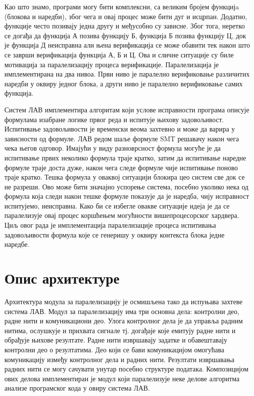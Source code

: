 \documentclass[12pt,oneside]{memoir}
\begin{document}
Као што знамо, програми могу бити комплексни, са великим бројем функцијa (блокова и наредби), због чега и овај процес може бити дуг и исцрпан. Додатно, функције често позивају једна другу и међусобно су зависне. Због тога, неретко се догађа да функција А позива функцију Б, функција Б позива функцију Ц, док је функција Д неисправна али њена верификација се може обавити тек након што се заврши верификација функција А, Б и Ц. Ова и сличне ситуације су биле мотивација за паралелизацију процеса верификације. Паралелизација је имплементирана на два нивоа. Први ниво је паралелно верификовање различитих наредби у оквиру једног блока, а други ниво је паралелно верификовање самих функција.

Систем ЛАВ имплементира алгоритам који услове исправности програма описује формулама изабране логике првог реда и испитује њихову задовољивост.  Испитивање задовољивости је  временски веома захтевно и може да варира у зависности од формуле. ЛАВ редом шаље формуле SMT решавачу након чега чека његов одговор. Имајући у виду разноврсност формула могуће је да испитивање првих неколико формула траје кратко, затим да испитивање наредне формуле траје доста дуже, након чега следе формуле чије испитивање поново траје кратко. Тешка формула у оваквој ситуацији блокира цео систем све док се не разреши. Ово може бити значајно успорење система, посебно уколико нека од формула која следи након тешке формуле показује да је наредба, чију исправност испитујемо, неисправна. 	
Како би се избегле овакве ситуације идеја је да се паралелизује овај процес коршћењем могућности вишепроцесорског хардвера. Циљ овог рада је имплементација паралелизације процеса испитивања задовољивости формула које се генеришу у оквиру контекста блока једне наредбе. 

\section{Опис архитектуре}

Архитектура модула за паралелизацију је осмишљена тако да испуњава захтеве система ЛАВ. Модул за паралелизацију има три основна дела: контролни део, радне нити и комуникациони део. Улога контролног дела је да управља радним нитима, ослушкује и прихвата сигнале тј. догађаје које емитују радне нити и обрађује њихове резултате. Радне нити извршавају задатке и обавештавају контролни део о резултатима. Део који се бави комуникацијом омогућава комуникацију између контролног дела и радних нити. Резултати извршавања радних нити се могу сачувати унутар посебно структуре података. Композицијом ових делова имплементиран је модул који паралелизује неке делове алгоритма анализе програмског кода у овиру система ЛАВ.
\newpage
\end{document}
